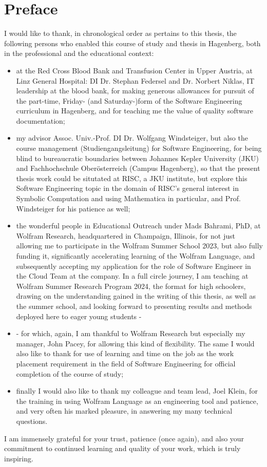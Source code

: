\chapter{Preface}

I would like to thank, in chronological order as pertains to this thesis, the following persons who enabled this course of study and thesis in Hagenberg, both in the professional and the educational context:

\begin{itemize}
    \item at the Red Cross Blood Bank and Transfusion Center in Upper Austria, at Linz General Hospital: DI Dr. Stephan Federsel and Dr. Norbert Niklas, IT leadership at the blood bank, for making generous allowances for pursuit of the part-time, Friday- (and Saturday-)form of the Software Engineering curriculum in Hagenberg, and for teaching me the value of quality software documentation;
    \item my advisor Assoc. Univ.-Prof. DI Dr. Wolfgang Windsteiger, but also the course management (Studiengangsleitung) for Software Engineering, for being blind to bureaucratic boundaries between Johannes Kepler University (JKU) and Fachhochschule Oberösterreich (Campus Hagenberg), so that the present thesis work could be situtated at RISC, a JKU institute, but explore this Software Engineering topic in the domain of RISC's general interest in Symbolic Computation and using Mathematica in particular, and Prof. Windsteiger for his patience as well;
    \item the wonderful people in Educational Outreach under Mads Bahrami, PhD, at Wolfram Research, headquartered in Champaign, Illinois, for not just allowing me to participate in the Wolfram Summer School 2023, but also fully funding it, significantly accelerating learning of the Wolfram Language, and subsequently accepting my application for the role of Software Engineer in the Cloud Team at the company. In a full circle journey, I am teaching at Wolfram Summer Research Program 2024, the format for high schoolers, drawing on the understanding gained in the writing of this thesis, as well as the summer school, and looking forward to presenting results and methods deployed here to eager young students - 
    \item - for which, again, I am thankful to Wolfram Research but especially my manager, John Pacey, for allowing this kind of flexibility. The same I would also like to thank for use of learning and time on the job as the work placement requirement in the field of Software Engineering for official completion of the course of study;
    \item finally I would also like to thank my colleague and team lead, Joel Klein, for the training in using Wolfram Language as an engineering tool and patience, and very often his marked pleasure, in answering my many technical questions.
\end{itemize}

I am immensely grateful for your trust, patience (once again), and also your commitment to continued learning and quality of your work, which is truly inspiring.

